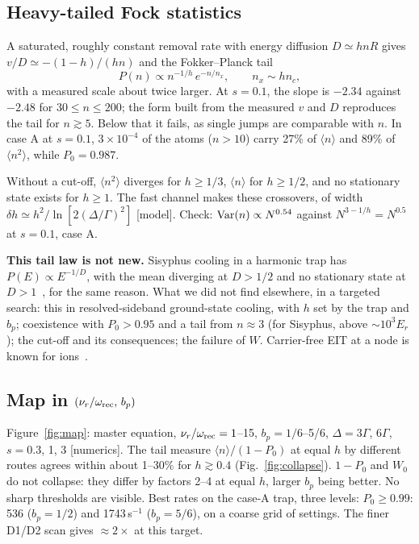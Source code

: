 \documentclass[11pt,a4paper]{article}
\begin{document}
\subsection{Heavy-tailed Fock statistics}
\label{sec:tail}\hypertarget{d:tail}{}
A saturated, roughly constant removal rate with energy diffusion $D\simeq hnR$ gives $v/D\simeq-(1-h)/(hn)$ and the Fokker--Planck tail
\begin{equation}
  P(n)\propto n^{-1/h}\,e^{-n/n_x},\qquad n_x\sim hn_c ,
\end{equation}
with a measured scale about twice larger. At $s=0.1$, the slope is $-2.34$ against $-2.48$ for $30\le n\le200$; the form built from the measured $v$ and $D$ reproduces the tail for $n\gtrsim5$. Below that it fails, as single jumps are comparable with $n$. In case A at $s=0.1$, $3\times10^{-4}$ of the atoms ($n>10$) carry 27\% of $\langle n\rangle$ and 89\% of $\langle n^2\rangle$, while $P_0=0.987$.

Without a cut-off, $\langle n^2\rangle$ diverges for $h\ge1/3$, $\langle n\rangle$ for $h\ge1/2$, and no stationary state exists for $h\ge1$. The fast channel makes these crossovers, of width $\delta h\simeq h^2/\ln[2(\Delta/\Gamma)^2]$ [model]. Check: ${\rm Var}(n)\propto N^{0.54}$ against $N^{3-1/h}=N^{0.5}$ at $s=0.1$, case A.

\textbf{This tail law is not new.} Sisyphus cooling in a harmonic trap has $P(E)\propto E^{-1/D}$, with the mean diverging at $D>1/2$ and no stationary state at $D>1$~\cite{dechant2015,dechant2016}, for the same reason. What we did not find elsewhere, in a targeted search: this in resolved-sideband ground-state cooling, with $h$ set by the trap and $b_p$; coexistence with $P_0>0.95$ and a tail from $n\approx3$ (for Sisyphus, above $\sim10^3E_r$); the cut-off and its consequences; the failure of $W$. Carrier-free EIT at a node is known for ions~\cite{xing2025}.

\subsection{Map in $(\nu_r/\omega_{\rm rec},\,b_p)$}
\label{sec:map}\hypertarget{d:map}{}
Figure~\ref{fig:map}: master equation, $\nu_r/\omega_{\rm rec}=1$--15, $b_p=1/6$--5/6, $\Delta=3\Gamma$, $6\Gamma$, $s=0.3$, 1, 3 [numerics]. The tail measure $\langle n\rangle/(1-P_0)$ at equal $h$ by different routes agrees within about 1--30\% for $h\gtrsim0.4$ (Fig.~\ref{fig:collapse}). $1-P_0$ and $W_0$ do not collapse: they differ by factors 2--4 at equal $h$, larger $b_p$ being better. No sharp thresholds are visible. Best rates on the case-A trap, three levels: $P_0\ge0.99$: 536 ($b_p=1/2$) and 1743\,s$^{-1}$ ($b_p=5/6$), on a coarse grid of settings. The finer D1/D2 scan gives $\approx2\times$ at this target.
\end{document}
